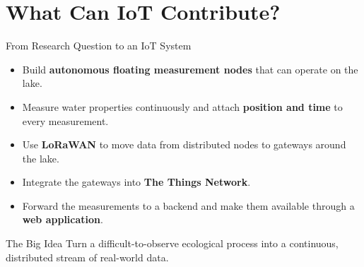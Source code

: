 \section[nosectionpage]{What Can IoT Contribute?}

\begin{frame}{From Research Question to an IoT System}
\begin{itemize}
    \item Build \textbf{autonomous floating measurement nodes} that can operate on the lake.
    \item Measure water properties continuously and attach \textbf{position and time} to every measurement.
    \item Use \textbf{LoRaWAN} to move data from distributed nodes to gateways around the lake.
    \item Integrate the gateways into \textbf{The Things Network}.
    \item Forward the measurements to a backend and make them available through a \textbf{web application}.
\end{itemize}
\begin{block}{The Big Idea}
Turn a difficult-to-observe ecological process into a continuous, distributed stream of real-world data.
\end{block}
\end{frame}
